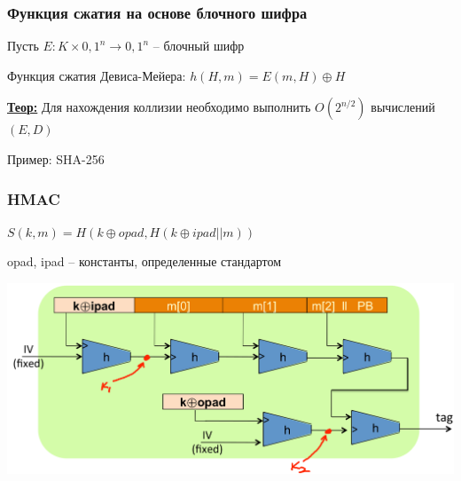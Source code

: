 \documentclass{beamer}
\newcommand{\theorema}[1]{{\textbf{\underline{Теор:}} #1}}
\begin{document}
\begin{frame}
  \frametitle{Функция сжатия на основе блочного шифра}

  Пусть $E:K \times {0,1}^{n} \rightarrow {0,1}^{n}$ -- блочный шифр

  \vspace{8mm}
  Функция сжатия Девиса-Мейера: $h(H,m) = E(m,H) \oplus H$

  \vspace{8mm}
  \theorema{Для нахождения коллизии необходимо выполнить $O(2^{n/2})$ вычислений $(E,D)$}

  \vspace{8mm}
  Пример: SHA-256
\end{frame}

\begin{frame}
  \frametitle{HMAC}

  $S(k,m) = H (k \oplus opad, H(k \oplus ipad || m))$

  opad, ipad -- константы, определенные стандартом

  \includegraphics[width=\linewidth]{./images/png/HMAC.png}
\end{frame}
\end{document}
